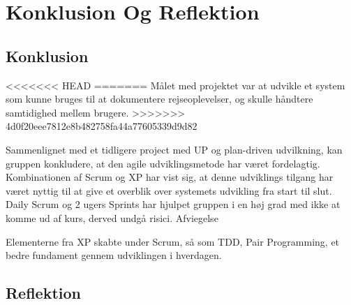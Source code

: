 \chapter{Konklusion Og Reflektion}\label{ch:KonklusionReflektion}

\section{Konklusion}
<<<<<<< HEAD
=======
Målet med projektet var at udvikle et system som kunne bruges til at dokumentere rejseoplevelser, og skulle håndtere samtidighed mellem brugere. 
>>>>>>> 4d0f20eee7812e8b482758fa44a77605339d9d82


Sammenlignet med et tidligere project med UP og plan-driven udvilkning, kan gruppen konkludere, at den agile udviklingsmetode har været fordelagtig. Kombinationen af Scrum og XP har vist sig, at denne udviklings tilgang har været nyttig til at give et overblik over systemets udvikling fra start til slut. Daily Scrum og 2 ugers Sprints har hjulpet gruppen i en høj grad med ikke at komme ud af kurs, derved undgå risici. Afviegelse 



 Elementerne fra XP skabte under Scrum, så som TDD, Pair Programming, et bedre fundament gennem udviklingen i hverdagen. 



\section{Reflektion}
